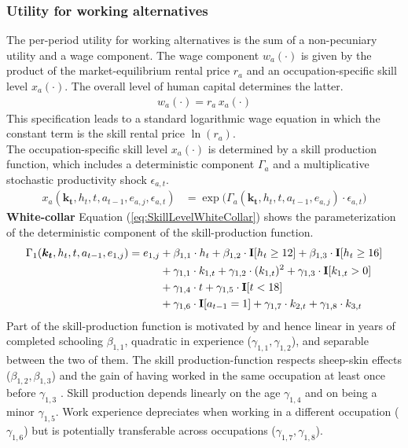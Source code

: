 \subsubsection*{Utility for working alternatives}
The per-period utility for working alternatives is the sum of a non-pecuniary utility and a wage component. The wage component $w_{a}(\cdot)$ is given by the product of the market-equilibrium rental price $r_{a}$ and an occupation-specific skill level $x_{a}(\cdot)$. The overall level of human capital determines the latter.
%
\begin{align*}
w_{a}(\cdot) = r_{a} \, x_{a}(\cdot)
\end{align*}
%
This specification leads to a standard logarithmic wage equation in which the constant term is the skill rental price $\ln(r_{a})$.\\

\noindent The occupation-specific skill level $x_{a}(\cdot)$ is determined by a skill production function, which includes a deterministic component $\Gamma_a$ and a multiplicative stochastic productivity shock $\epsilon_{a,t}$.
%
\begin{align}%
    x_{a}(\bm{k_t}, h_t, t, a_{t-1}, e_{a, j}, \epsilon_{a,t}) & = \exp \big( \Gamma_{a}(\bm{k_t},  h_t, t, a_{t-1}, e_{a,j}) \cdot \epsilon_{a,t} \big) \nonumber
\end{align}
%
\noindent\textbf{White-collar} Equation (\ref{eq:SkillLevelWhiteCollar}) shows the parameterization of the deterministic component of the skill-production function.
%
\begin{align}\label{eq:SkillLevelWhiteCollar}
    \Gamma_1(\bm{k_t}, h_t, t, a_{t-1}, e_{1, j}) = e_{1,j} & + \beta_{1,1} \cdot h_t + \beta_{1, 2} \cdot {\textbf{I}}[h_t \geq 12] + \beta_{1,3} \cdot {\textbf{I}}[h_t\geq 16]\\ \nonumber
                                  & + \gamma_{1, 1} \cdot  k_{1,t} + \gamma_{1,2} \cdot  (k_{1,t})^2 + \gamma_{1,3} \cdot  {\textbf{I}}[k_{1,t} > 0] \\ \nonumber
                                & + \gamma_{1,4} \cdot  t + \gamma_{1,5} \cdot {\textbf{I}}[t < 18]\\ \nonumber
                                  & + \gamma_{1,6} \cdot {\textbf{I}}[a_{t-1} = 1] + \gamma_{1,7} \cdot  k_{2,t} + \gamma_{1,8} \cdot  k_{3,t} \nonumber
\end{align}
%
\noindent Part of the skill-production function is motivated by \citet{Mincer.1958, Mincer.1974} and hence linear in years of completed schooling $\beta_{1,1}$, quadratic in experience ($\gamma_{1,1}, \gamma_{1,2}$), and separable between the two of them. The skill production-function respects sheep-skin effects ($\beta_{1,2}, \beta_{1,3}$) and the gain of having worked in the same occupation at least once before $\gamma_{1,3}$ \citep{Spence.1973, Jaeger.1996}. Skill production depends linearly on the age $\gamma_{1,4}$ and on being a minor $\gamma_{1,5}$. Work experience depreciates when working in a different occupation ($\gamma_{1,6}$) but is potentially transferable across occupations ($\gamma_{1,7}, \gamma_{1,8}$). \\


